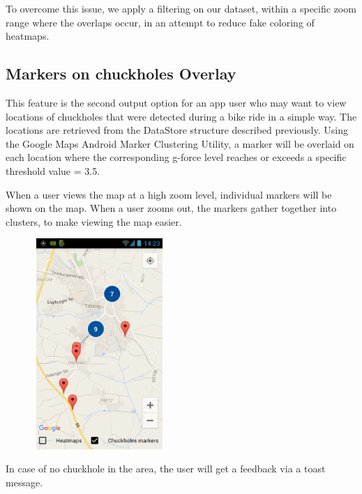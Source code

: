 \documentclass[10pt,a4paper]{article} %
\begin{document}
    To overcome this issue, we apply a filtering on our dataset, within a specific zoom range where the overlaps occur, in an attempt to reduce fake coloring of heatmaps.
    
    
    
    \subsection{ Markers on chuckholes Overlay}
    
    This feature is the second output option for an app user who may want to view locations of chuckholes that were detected during a bike ride in a simple way. The locations are retrieved from the DataStore structure described previously. Using the Google Maps Android Marker Clustering Utility, a marker will be overlaid on each location where the corresponding g-force level reaches or exceeds a specific threshold value = 3.5. 
    
    When a user views the map at a high zoom level, individual markers will be shown on the map. When a user zooms out, the markers gather together into clusters, to make viewing the map easier.
    
    \begin{figure}[H]
    \centering
	
	  
	   
       \includegraphics[width=5cm, height=8cm]{pic3}
    
       
        \end{figure}
    
    In case of no chuckhole in the area, the user will get a feedback via a toast message.
    

    
    

    
    
    
    
    
    
    
    
    
    
    
    
    
    
    \nocite{*}
    
    
    

    
    
    
    
\end{document}
